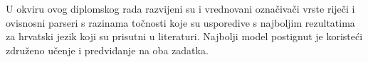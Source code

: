 U okviru ovog diplomskog rada razvijeni su i vrednovani označivači vrste riječi
i ovisnosni parseri s razinama točnosti koje su usporedive s najboljim
rezultatima za hrvatski jezik koji su prisutni u literaturi. Najbolji model
postignut je koristeći združeno učenje i predviđanje na oba zadatka.
